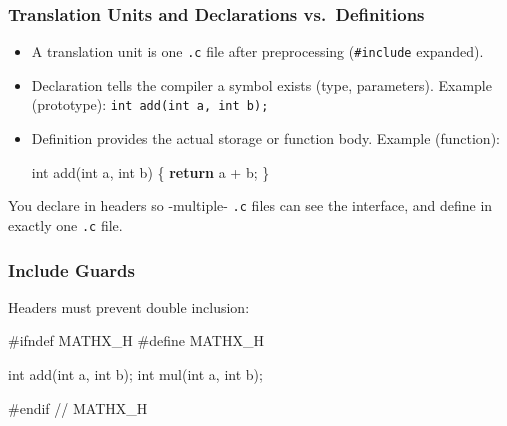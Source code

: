 \documentclass[
  letterpaper,
  DIV=11,
  numbers=noendperiod]{scrreprt}
\newenvironment{Shaded}{\begin{snugshade}}{\end{snugshade}}
\newcommand{\CommentTok}[1]{\textcolor[rgb]{0.37,0.37,0.37}{#1}}
\newcommand{\ControlFlowTok}[1]{\textcolor[rgb]{0.00,0.23,0.31}{\textbf{#1}}}
\newcommand{\DataTypeTok}[1]{\textcolor[rgb]{0.68,0.00,0.00}{#1}}
\newcommand{\NormalTok}[1]{\textcolor[rgb]{0.00,0.23,0.31}{#1}}
\newcommand{\OperatorTok}[1]{\textcolor[rgb]{0.37,0.37,0.37}{#1}}
\newcommand{\PreprocessorTok}[1]{\textcolor[rgb]{0.68,0.00,0.00}{#1}}
\begin{document}
\subsubsection{Translation Units and Declarations
vs.~Definitions}\label{translation-units-and-declarations-vs.-definitions}

\begin{itemize}
\item
  A translation unit is one \texttt{.c} file after preprocessing
  (\texttt{\#include} expanded).
\item
  Declaration tells the compiler a symbol exists (type, parameters).
  Example (prototype): \texttt{int\ add(int\ a,\ int\ b);}
\item
  Definition provides the actual storage or function body. Example
  (function):

\begin{Shaded}
\begin{Highlighting}[]
\DataTypeTok{int}\NormalTok{ add}\OperatorTok{(}\DataTypeTok{int}\NormalTok{ a}\OperatorTok{,} \DataTypeTok{int}\NormalTok{ b}\OperatorTok{)} \OperatorTok{\{} \ControlFlowTok{return}\NormalTok{ a }\OperatorTok{+}\NormalTok{ b}\OperatorTok{;} \OperatorTok{\}}
\end{Highlighting}
\end{Shaded}
\end{itemize}

You declare in headers so -multiple- \texttt{.c} files can see the
interface, and define in exactly one \texttt{.c} file.

\subsubsection{Include Guards}\label{include-guards}

Headers must prevent double inclusion:

\begin{Shaded}
\begin{Highlighting}[]
\PreprocessorTok{\#ifndef MATHX\_H}
\PreprocessorTok{\#define MATHX\_H}

\DataTypeTok{int}\NormalTok{ add}\OperatorTok{(}\DataTypeTok{int}\NormalTok{ a}\OperatorTok{,} \DataTypeTok{int}\NormalTok{ b}\OperatorTok{);}
\DataTypeTok{int}\NormalTok{ mul}\OperatorTok{(}\DataTypeTok{int}\NormalTok{ a}\OperatorTok{,} \DataTypeTok{int}\NormalTok{ b}\OperatorTok{);}

\PreprocessorTok{\#endif }\CommentTok{// MATHX\_H}
\end{Highlighting}
\end{Shaded}
\end{document}
